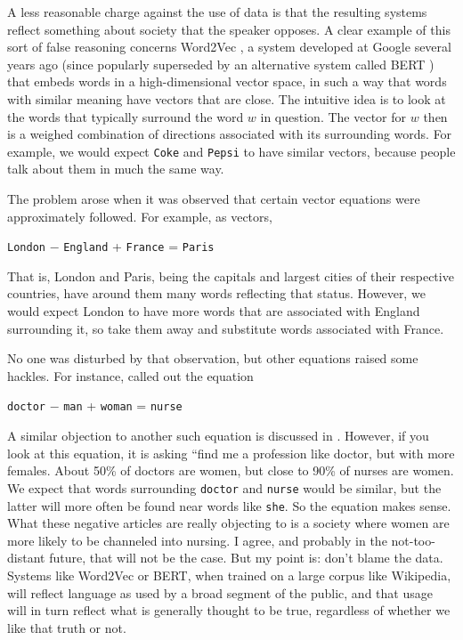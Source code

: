 \documentclass[11pt]{article}
\begin{document}
A less reasonable charge against the use of data is that the resulting systems reflect something about society that the speaker opposes.  A clear example of this sort of false reasoning concerns Word2Vec \cite{word2vec}, a system developed at Google several years ago (since popularly superseded by an alternative system called BERT \cite{bert}) that embeds words in a high-dimensional vector space, in such a way that words with similar meaning have vectors that are close.  The intuitive idea is to look at the words that typically surround the word $w$ in question.  The vector for $w$ then is a weighed combination of directions associated with its surrounding words.  For example, we would expect {\tt Coke} and {\tt Pepsi} to have similar vectors, because people talk about them in much the same way.

The problem arose when it was observed that certain vector equations were approximately followed.  For example, as vectors,

\begin{center}
{\tt London} $-$ {\tt England} + {\tt France} = {\tt Paris}
\end{center}
That is, London and Paris, being the capitals and largest cities of their respective countries, have around them many words reflecting that status.  However, we would expect London to have more words that are associated with England surrounding it, so take them away and substitute words associated with France.

No one was disturbed by that observation, but other equations raised some hackles.  For instance, \cite{buono} called out the equation

\begin{center}
{\tt doctor} $-$ {\tt man} + {\tt woman} = {\tt nurse}
\end{center}
A similar objection to another such equation is discussed in \cite{boluk}.  However, if you look at this equation, it is asking ``find me a profession like doctor, but with more females.  About 50\% of doctors are women, but close to 90\% of nurses are women.  We expect that words surrounding {\tt doctor} and {\tt nurse} would be similar, but the latter will more often be found near words like {\tt she}.  So the equation makes sense.  What these negative articles are really objecting to is a society where women are more likely to be channeled into nursing.  I agree, and probably in the not-too-distant future, that will not be the case.  But my point is: don't blame the data.  Systems like Word2Vec or BERT, when trained on a large corpus like Wikipedia, will reflect language as used by a broad segment of the public, and that usage will in turn reflect what is generally thought to be true, regardless of whether we like that truth or not.
\end{document}
